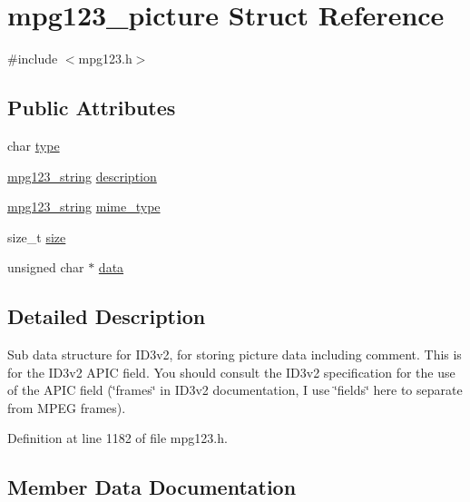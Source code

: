 \hypertarget{structmpg123__picture}{}\section{mpg123\+\_\+picture Struct Reference}
\label{structmpg123__picture}


{\ttfamily \#include $<$mpg123.\+h$>$}

\subsection*{Public Attributes}
\begin{DoxyCompactItemize}
\item 
char \mbox{\hyperlink{structmpg123__picture_a4b5897550d36cad90aa463e318a7ca54}{type}}
\item 
\mbox{\hyperlink{structmpg123__string}{mpg123\+\_\+string}} \mbox{\hyperlink{structmpg123__picture_a2bd7ec13cbd4cbe673cdccf5a0603a94}{description}}
\item 
\mbox{\hyperlink{structmpg123__string}{mpg123\+\_\+string}} \mbox{\hyperlink{structmpg123__picture_ac36b86a29200e2df5ee60e9d73c231a6}{mime\+\_\+type}}
\item 
size\+\_\+t \mbox{\hyperlink{structmpg123__picture_adac68a10895739d1d1772f6340c384eb}{size}}
\item 
unsigned char $\ast$ \mbox{\hyperlink{structmpg123__picture_a988df48f24da301a7c80f8da5cf7a17c}{data}}
\end{DoxyCompactItemize}


\subsection{Detailed Description}
Sub data structure for I\+D3v2, for storing picture data including comment. This is for the I\+D3v2 A\+P\+IC field. You should consult the I\+D3v2 specification for the use of the A\+P\+IC field (\char`\"{}frames\char`\"{} in I\+D3v2 documentation, I use \char`\"{}fields\char`\"{} here to separate from M\+P\+EG frames). 

Definition at line 1182 of file mpg123.\+h.



\subsection{Member Data Documentation}
\mbox{\label{structmpg123__picture_a988df48f24da301a7c80f8da5cf7a17c}} 
